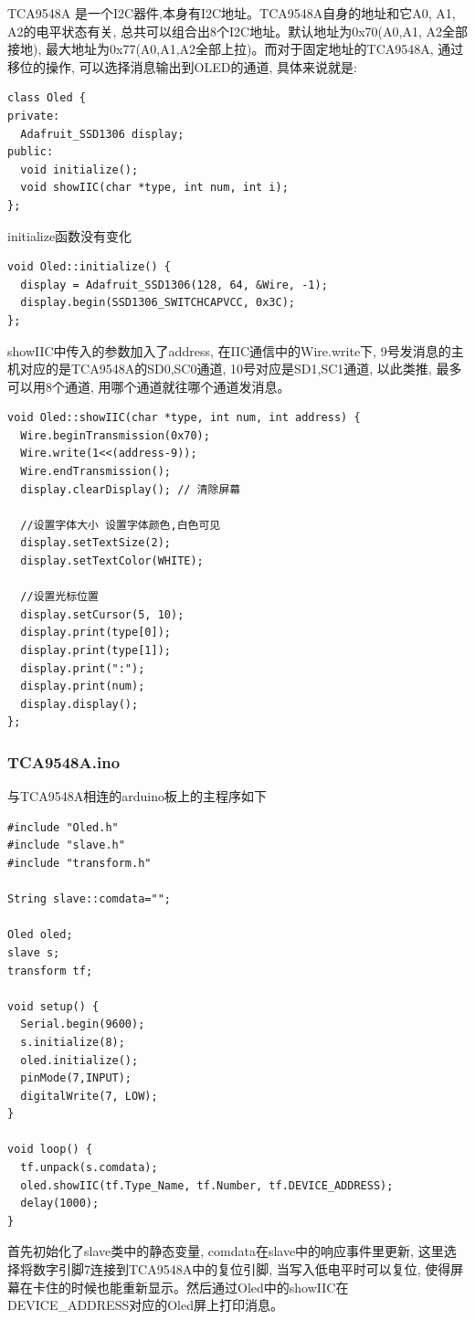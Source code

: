 \documentclass{article}
\begin{document}
TCA9548A 是一个I2C器件,本身有I2C地址。TCA9548A自身的地址和它A0, A1, A2的电平状态有关, 总共可以组合出8个I2C地址。默认地址为0x70(A0,A1, A2全部接地), 
最大地址为0x77(A0,A1,A2全部上拉)。而对于固定地址的TCA9548A, 通过移位的操作, 可以选择消息输出到OLED的通道, 具体来说就是:

\begin{lstlisting}
class Oled {
private:
  Adafruit_SSD1306 display;
public:
  void initialize();
  void showIIC(char *type, int num, int i);
};
\end{lstlisting}

initialize函数没有变化
\begin{lstlisting}
void Oled::initialize() {
  display = Adafruit_SSD1306(128, 64, &Wire, -1);
  display.begin(SSD1306_SWITCHCAPVCC, 0x3C);
};  
\end{lstlisting}

showIIC中传入的参数加入了address, 在IIC通信中的Wire.write下, 9号发消息的主机对应的是TCA9548A的SD0,SC0通道, 10号对应是SD1,SC1通道, 以此类推, 
最多可以用8个通道, 用哪个通道就往哪个通道发消息。
\begin{lstlisting}
void Oled::showIIC(char *type, int num, int address) {
  Wire.beginTransmission(0x70);
  Wire.write(1<<(address-9));
  Wire.endTransmission();
  display.clearDisplay(); // 清除屏幕

  //设置字体大小 设置字体颜色,白色可见
  display.setTextSize(2);
  display.setTextColor(WHITE);

  //设置光标位置 
  display.setCursor(5, 10);
  display.print(type[0]);
  display.print(type[1]);
  display.print(":");
  display.print(num);
  display.display(); 
};
\end{lstlisting}

\subsubsection{TCA9548A.ino}
与TCA9548A相连的arduino板上的主程序如下
\begin{lstlisting}
#include "Oled.h"
#include "slave.h"
#include "transform.h"

String slave::comdata="";

Oled oled;
slave s;
transform tf;

void setup() {
  Serial.begin(9600);
  s.initialize(8);
  oled.initialize();
  pinMode(7,INPUT);
  digitalWrite(7, LOW);
}

void loop() {
  tf.unpack(s.comdata);
  oled.showIIC(tf.Type_Name, tf.Number, tf.DEVICE_ADDRESS);
  delay(1000);
}
\end{lstlisting}
首先初始化了slave类中的静态变量, comdata在slave中的响应事件里更新, 这里选择将数字引脚7连接到TCA9548A中的复位引脚, 当写入低电平时可以复位,
使得屏幕在卡住的时候也能重新显示。然后通过Oled中的showIIC在DEVICE\_ADDRESS对应的Oled屏上打印消息。
\end{document}
